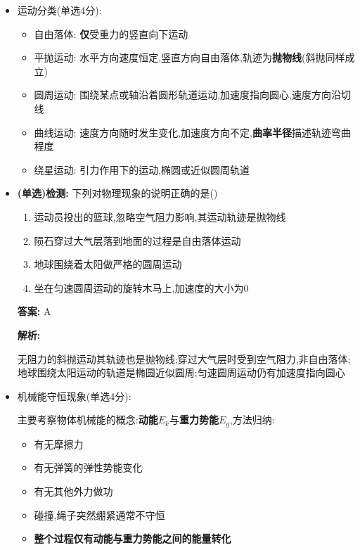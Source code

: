 \documentclass{article}
\begin{document}
\begin{itemize}
        \newpage

        \item 运动分类(单选4分):
        \begin{itemize}
            \item 自由落体: \textbf{仅}受重力的竖直向下运动
            \item 平抛运动: 水平方向速度恒定,竖直方向自由落体,轨迹为\textbf{抛物线}(斜抛同样成立)
            \item 圆周运动: 围绕某点或轴沿着圆形轨道运动,加速度指向圆心,速度方向沿切线
            \item 曲线运动: 速度方向随时发生变化,加速度方向不定,\textbf{曲率半径}描述轨迹弯曲程度
            \item 绕星运动: 引力作用下的运动,椭圆或近似圆周轨道
        \end{itemize}

        \vspace{1em}

        \item[] \textbf{(单选)检测:} 下列对物理现象的说明正确的是(\qquad)
        
        \begin{enumerate}[label=\Alph*.]
            \item 运动员投出的篮球,忽略空气阻力影响,其运动轨迹是抛物线
            \item 陨石穿过大气层落到地面的过程是自由落体运动
            \item 地球围绕着太阳做严格的圆周运动
            \item 坐在匀速圆周运动的旋转木马上,加速度的大小为0
        \end{enumerate}

        \textbf{答案:} A

        \textbf{解析:} 
        
        \hspace{2em}无阻力的斜抛运动其轨迹也是抛物线;穿过大气层时受到空气阻力,非自由落体;
        地球围绕太阳运动的轨道是椭圆近似圆周;匀速圆周运动仍有加速度指向圆心

        \vspace{2em}
        
        \item 机械能守恒现象(单选4分):
        
        \hspace{2em}主要考察物体机械能的概念:\textbf{动能$E_{k}$}与\textbf{重力势能$E_{g}$},方法归纳:
        \begin{itemize}
            \item 有无摩擦力
            \item 有无弹簧的弹性势能变化
            \item 有无其他外力做功
            \item 碰撞,绳子突然绷紧通常不守恒
            \item \textbf{整个过程仅有动能与重力势能之间的能量转化}
        \end{itemize}


\end{itemize}
\end{document}
